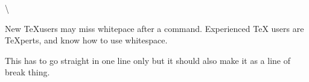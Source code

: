 \documentclass{article}
\begin{document}
\textbackslash

New \TeX users may miss whitepace after a command. %
Experienced \TeX{} users are \TeX perts, and know how to use whitespace. %

This has to go straight in one line only%
but it should also make it as a line of%
break thing.
\end{document}
